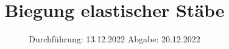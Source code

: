 

\subject{V103}
\title{Biegung elastischer Stäbe}
\date{%
  Durchführung: 13.12.2022
  \hspace{3em}
  Abgabe: 20.12.2022
}


\maketitle
\thispagestyle{empty}
\tableofcontents
\newpage





\printbibliography{}


